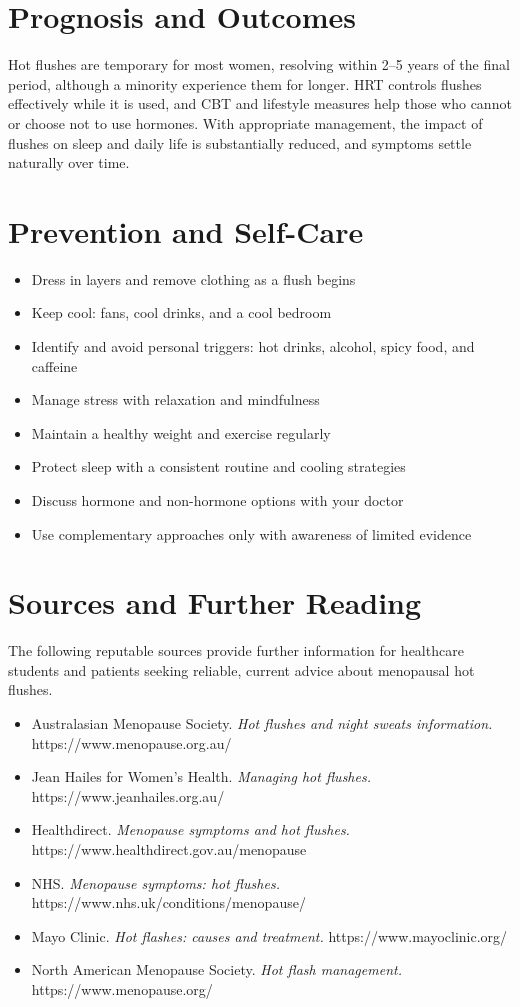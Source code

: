 \section*{Prognosis and Outcomes}
Hot flushes are temporary for most women, resolving within 2--5 years of the final period, although a minority experience them for longer. HRT controls flushes effectively while it is used, and CBT and lifestyle measures help those who cannot or choose not to use hormones. With appropriate management, the impact of flushes on sleep and daily life is substantially reduced, and symptoms settle naturally over time.

\section*{Prevention and Self-Care}
\begin{itemize}
    \item Dress in layers and remove clothing as a flush begins
    \item Keep cool: fans, cool drinks, and a cool bedroom
    \item Identify and avoid personal triggers: hot drinks, alcohol, spicy food, and caffeine
    \item Manage stress with relaxation and mindfulness
    \item Maintain a healthy weight and exercise regularly
    \item Protect sleep with a consistent routine and cooling strategies
    \item Discuss hormone and non-hormone options with your doctor
    \item Use complementary approaches only with awareness of limited evidence
\end{itemize}

\section*{Sources and Further Reading}
The following reputable sources provide further information for healthcare students and patients seeking reliable, current advice about menopausal hot flushes.

\begin{itemize}
    \item Australasian Menopause Society. \textit{Hot flushes and night sweats information.} https://www.menopause.org.au/
    \item Jean Hailes for Women's Health. \textit{Managing hot flushes.} https://www.jeanhailes.org.au/
    \item Healthdirect. \textit{Menopause symptoms and hot flushes.} https://www.healthdirect.gov.au/menopause
    \item NHS. \textit{Menopause symptoms: hot flushes.} https://www.nhs.uk/conditions/menopause/
    \item Mayo Clinic. \textit{Hot flashes: causes and treatment.} https://www.mayoclinic.org/
    \item North American Menopause Society. \textit{Hot flash management.} https://www.menopause.org/
\end{itemize}
